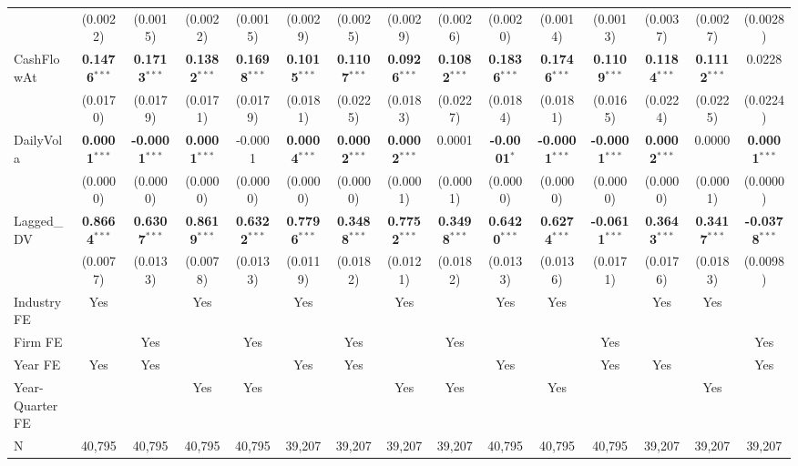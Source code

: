 \begin{landscape}
\begin{table}[H]
\begin{tabular}{lcccccccccccccc}
 & (0.0022) & (0.0015) & (0.0022) & (0.0015) & (0.0029) & (0.0025) & (0.0029) & (0.0026) & (0.0020) & (0.0014) & (0.0013) & (0.0037) & (0.0027) & (0.0028) \\
CashFlowAt & \textbf{0.1476}$^{***}$ & \textbf{0.1713}$^{***}$ & \textbf{0.1382}$^{***}$ & \textbf{0.1698}$^{***}$ & \textbf{0.1015}$^{***}$ & \textbf{0.1107}$^{***}$ & \textbf{0.0926}$^{***}$ & \textbf{0.1082}$^{***}$ & \textbf{0.1836}$^{***}$ & \textbf{0.1746}$^{***}$ & \textbf{0.1109}$^{***}$ & \textbf{0.1184}$^{***}$ & \textbf{0.1112}$^{***}$ & 0.0228 \\
 & (0.0170) & (0.0179) & (0.0171) & (0.0179) & (0.0181) & (0.0225) & (0.0183) & (0.0227) & (0.0184) & (0.0181) & (0.0165) & (0.0224) & (0.0225) & (0.0224) \\
DailyVola & \textbf{0.0001}$^{***}$ & \textbf{-0.0001}$^{***}$ & \textbf{0.0001}$^{***}$ & -0.0001 & \textbf{0.0004}$^{***}$ & \textbf{0.0002}$^{***}$ & \textbf{0.0002}$^{***}$ & 0.0001 & \textbf{-0.0001}$^{*}$ & \textbf{-0.0001}$^{***}$ & \textbf{-0.0001}$^{***}$ & \textbf{0.0002}$^{***}$ & 0.0000 & \textbf{0.0001}$^{***}$ \\
 & (0.0000) & (0.0000) & (0.0000) & (0.0000) & (0.0000) & (0.0000) & (0.0001) & (0.0001) & (0.0000) & (0.0000) & (0.0000) & (0.0000) & (0.0001) & (0.0000) \\
Lagged\_DV & \textbf{0.8664}$^{***}$ & \textbf{0.6307}$^{***}$ & \textbf{0.8619}$^{***}$ & \textbf{0.6322}$^{***}$ & \textbf{0.7796}$^{***}$ & \textbf{0.3488}$^{***}$ & \textbf{0.7752}$^{***}$ & \textbf{0.3498}$^{***}$ & \textbf{0.6420}$^{***}$ & \textbf{0.6274}$^{***}$ & \textbf{-0.0611}$^{***}$ & \textbf{0.3643}$^{***}$ & \textbf{0.3417}$^{***}$ & \textbf{-0.0378}$^{***}$ \\
 & (0.0077) & (0.0133) & (0.0078) & (0.0133) & (0.0119) & (0.0182) & (0.0121) & (0.0182) & (0.0133) & (0.0136) & (0.0171) & (0.0176) & (0.0183) & (0.0098) \\
\midrule
Industry FE & Yes &  & Yes &  & Yes &  & Yes &  & Yes & Yes &  & Yes & Yes &  \\
Firm FE &  & Yes &  & Yes &  & Yes &  & Yes &  &  & Yes &  &  & Yes \\
Year FE & Yes & Yes &  &  & Yes & Yes &  &  & Yes &  & Yes & Yes &  & Yes \\
Year-Quarter FE &  &  & Yes & Yes &  &  & Yes & Yes &  & Yes &  &  & Yes &  \\
\midrule
N & 40,795 & 40,795 & 40,795 & 40,795 & 39,207 & 39,207 & 39,207 & 39,207 & 40,795 & 40,795 & 40,795 & 39,207 & 39,207 & 39,207 \\

\end{tabular}
\end{table}
\end{landscape}
